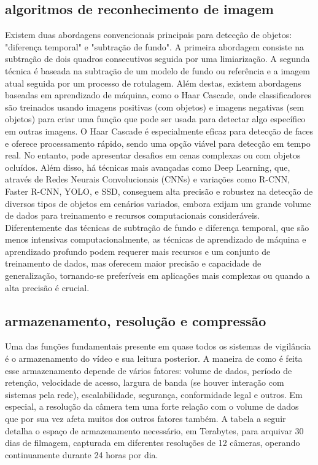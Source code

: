 \documentclass[12pt, %
openright, 
oneside, %
a4paper,    %
brazil]{facom-ufu-abntex2}
\begin{document}
\subsection{algoritmos de reconhecimento de imagem}

Existem duas abordagens convencionais principais para detecção de objetos:
"diferença temporal" e "subtração de fundo". A primeira abordagem consiste na
subtração de dois quadros consecutivos seguida por uma limiarização. A segunda
técnica é baseada na subtração de um modelo de fundo ou referência e a imagem
atual seguida por um processo de rotulagem. Além destas, existem abordagens
baseadas em aprendizado de máquina, como o Haar Cascade, onde classificadores
são treinados usando imagens positivas (com objetos) e imagens negativas (sem
objetos) para criar uma função que pode ser usada para detectar algo específico
em outras imagens. O Haar Cascade é especialmente eficaz para detecção de faces
e oferece processamento rápido, sendo uma opção viável para detecção em tempo
real. No entanto, pode apresentar desafios em cenas complexas ou com objetos
ocluídos. Além disso, há técnicas mais avançadas como Deep Learning, que,
através de Redes Neurais Convolucionais (CNNs) e variações como R-CNN, Faster
R-CNN, YOLO, e SSD, conseguem alta precisão e robustez na detecção de diversos
tipos de objetos em cenários variados, embora exijam um grande volume de dados
para treinamento e recursos computacionais consideráveis. Diferentemente das
técnicas de subtração de fundo e diferença temporal, que são menos intensivas
computacionalmente, as técnicas de aprendizado de máquina e aprendizado
profundo podem requerer mais recursos e um conjunto de treinamento de dados,
mas oferecem maior precisão e capacidade de generalização, tornando-se
preferíveis em aplicações mais complexas ou quando a alta precisão é crucial.

\subsection{armazenamento, resolução e compressão}

Uma das funções fundamentais presente em quase todos os sistemas de vigilância
é o armazenamento do vídeo e sua leitura posterior. A maneira de como é feita
esse armazenamento depende de vários fatores: volume de dados, período de
retenção, velocidade de acesso, largura de banda (se houver interação com
sistemas pela rede), escalabilidade, segurança, conformidade legal e outros. Em
especial, a resolução da câmera tem uma forte relação com o volume de dados que
por sua vez afeta muitos dos outros fatores também. A tabela a seguir detalha o
espaço de armazenamento necessário, em Terabytes, para arquivar 30 dias de
filmagem, capturada em diferentes resoluções de 12 câmeras, operando
continuamente durante 24 horas por dia. \clearpage
\end{document}
